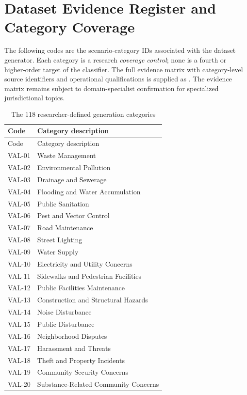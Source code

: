 \appendix
\chapter{Dataset Evidence Register and Category Coverage}
The following codes are the scenario-category IDs associated with the dataset generator. Each category is a research \emph{coverage control}; none is a fourth or higher-order target of the classifier. The full evidence matrix with category-level source identifiers and operational qualifications is supplied as . The evidence matrix remains subject to domain-specialist confirmation for specialized jurisdictional topics.
\small
\begin{longtable}{p{}p{}}
\caption{The 118 researcher-defined generation categories}\\\toprule
Code & Category description\\\midrule\endfirsthead
\toprule Code & Category description\\\midrule\endhead
VAL-01 & Waste Management\\
VAL-02 & Environmental Pollution\\
VAL-03 & Drainage and Sewerage\\
VAL-04 & Flooding and Water Accumulation\\
VAL-05 & Public Sanitation\\
VAL-06 & Pest and Vector Control\\
VAL-07 & Road Maintenance\\
VAL-08 & Street Lighting\\
VAL-09 & Water Supply\\
VAL-10 & Electricity and Utility Concerns\\
VAL-11 & Sidewalks and Pedestrian Facilities\\
VAL-12 & Public Facilities Maintenance\\
VAL-13 & Construction and Structural Hazards\\
VAL-14 & Noise Disturbance\\
VAL-15 & Public Disturbance\\
VAL-16 & Neighborhood Disputes\\
VAL-17 & Harassment and Threats\\
VAL-18 & Theft and Property Incidents\\
VAL-19 & Community Security Concerns\\
VAL-20 & Substance-Related Community Concerns\\

\end{longtable}
